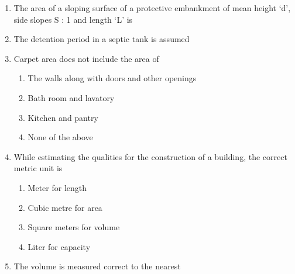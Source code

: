 \documentclass[11pt,a4paper]{article}
\begin{document}
\begin{enumerate}
\begin{enumerate*}[itemjoin=\qquad, label=\Alph*.]
\item{100 mm}
\item{150 mm}
\item{200 mm}
\item{175 mm}
\end{enumerate*}
\item{The area of a sloping surface of a protective embankment of mean height `d', side slopes S : 1 and length `L' is
}
\\
\item{The detention period in a septic tank is assumed}
\\
\item{Carpet area does not include the area of}
\begin{enumerate}[label=\Alph*.]
\item{The walls along with doors and other openings}
\item{Bath room and lavatory}
\item{Kitchen and pantry}
\item{None of the above}
\end{enumerate}
\item{While estimating the qualities for the construction of a building, the correct metric unit is}
\begin{enumerate}[label=\Alph*.]
\item{Meter for length}
\item{Cubic metre for area}
\item{Square meters for volume}
\item{Liter for capacity}
\end{enumerate}
\item{The volume is measured correct to the nearest}

\end{enumerate}
\end{document}
